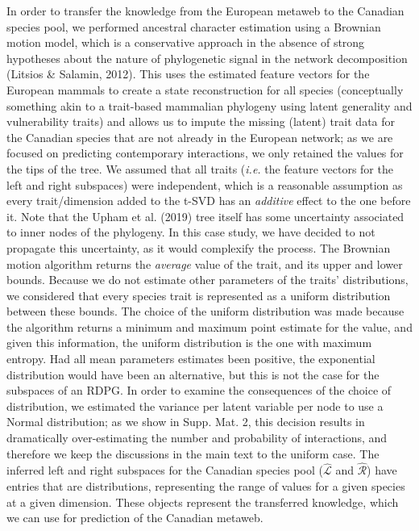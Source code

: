 \documentclass[10pt,oneside]{article}
\begin{document}
In order to transfer the knowledge from the European metaweb to the
Canadian species pool, we performed ancestral character estimation using
a Brownian motion model, which is a conservative approach in the absence
of strong hypotheses about the nature of phylogenetic signal in the
network decomposition (Litsios \& Salamin, 2012). This uses the
estimated feature vectors for the European mammals to create a state
reconstruction for all species (conceptually something akin to a
trait-based mammalian phylogeny using latent generality and
vulnerability traits) and allows us to impute the missing (latent) trait
data for the Canadian species that are not already in the European
network; as we are focused on predicting contemporary interactions, we
only retained the values for the tips of the tree. We assumed that all
traits (\emph{i.e.} the feature vectors for the left and right
subspaces) were independent, which is a reasonable assumption as every
trait/dimension added to the t-SVD has an \emph{additive} effect to the
one before it. Note that the Upham et al. (2019) tree itself has some
uncertainty associated to inner nodes of the phylogeny. In this case
study, we have decided to not propagate this uncertainty, as it would
complexify the process. The Brownian motion algorithm returns the
\emph{average} value of the trait, and its upper and lower bounds.
Because we do not estimate other parameters of the traits'
distributions, we considered that every species trait is represented as
a uniform distribution between these bounds. The choice of the uniform
distribution was made because the algorithm returns a minimum and
maximum point estimate for the value, and given this information, the
uniform distribution is the one with maximum entropy. Had all mean
parameters estimates been positive, the exponential distribution would
have been an alternative, but this is not the case for the subspaces of
an RDPG. In order to examine the consequences of the choice of
distribution, we estimated the variance per latent variable per node to
use a Normal distribution; as we show in Supp. Mat. 2, this decision
results in dramatically over-estimating the number and probability of
interactions, and therefore we keep the discussions in the main text to
the uniform case. The inferred left and right subspaces for the Canadian
species pool (\(\hat{\mathscr{L}}\) and \(\hat{\mathscr{R}}\)) have
entries that are distributions, representing the range of values for a
given species at a given dimension. These objects represent the
transferred knowledge, which we can use for prediction of the Canadian
metaweb.
\end{document}
